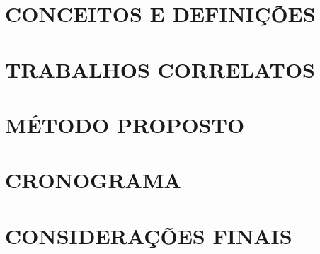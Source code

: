\documentclass[
	12pt,				%
    oneside,
	a4paper,			%
	chapter=TITLE,		%
	english,			%
	brazil				%
	]{abntex2}
\begin{document}
\chapter{CONCEITOS E DEFINIÇÕES}
\label{chapter:fundamentacao}


\chapter{TRABALHOS CORRELATOS}
\label{chapter:correlatos}
%


\chapter{MÉTODO PROPOSTO}
\label{chapter:metodo}


\chapter{CRONOGRAMA}
\label{chapter:cronograma}
%

\chapter{CONSIDERAÇÕES FINAIS}
\label{chapter:consideracoes}
%
%


\printindex
\end{document}
